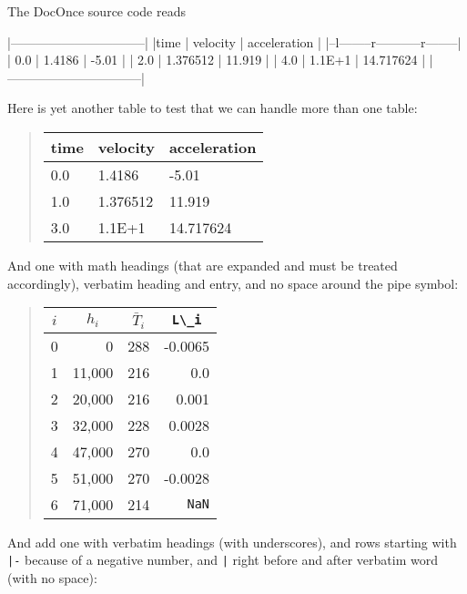 \documentclass[%
oneside,                 %
final,                   %
10pt]{article}
\theoremstyle{definition}
\begin{document}
\begin{enumerate}
The DocOnce source code reads
\bccq

  |--------------------------------|
  |time  | velocity | acceleration |
  |--l--------r-----------r--------|
  | 0.0  | 1.4186   | -5.01        |
  | 2.0  | 1.376512 | 11.919       |
  | 4.0  | 1.1E+1   | 14.717624    |
  |--------------------------------|

\eccq

Here is yet another table to test that we can handle more than
one table:


\begin{quote}
\begin{tabular}{lll}
\hline
\multicolumn{1}{l}{ time } & \multicolumn{1}{l}{ velocity } & \multicolumn{1}{l}{ acceleration } \\
\hline
0.0  & 1.4186   & -5.01        \\
1.0  & 1.376512 & 11.919       \\
3.0  & 1.1E+1   & 14.717624    \\
\hline
\end{tabular}
\end{quote}

\noindent
And one with math headings (that are expanded and must be treated
accordingly), verbatim heading and entry, and no space around the pipe
symbol:


\begin{quote}
\begin{tabular}{lrrr}
\hline
\multicolumn{1}{c}{ $i$ } & \multicolumn{1}{c}{ $h_i$ } & \multicolumn{1}{c}{ $\bar T_i$ } & \multicolumn{1}{c}{ \Verb!L\_i! } \\
\hline
0   & 0      & 288        & -0.0065    \\
1   & 11,000 & 216        & 0.0        \\
2   & 20,000 & 216        & 0.001      \\
3   & 32,000 & 228        & 0.0028     \\
4   & 47,000 & 270        & 0.0        \\
5   & 51,000 & 270        & -0.0028    \\
6   & 71,000 & 214        & \texttt{NaN} \\
\hline
\end{tabular}
\end{quote}

\noindent
And add one with verbatim headings (with underscores),
and rows starting with \texttt{|-} because of a negative number,
and \texttt{|} right before and after verbatim word (with no space):



\end{enumerate}
\end{document}
